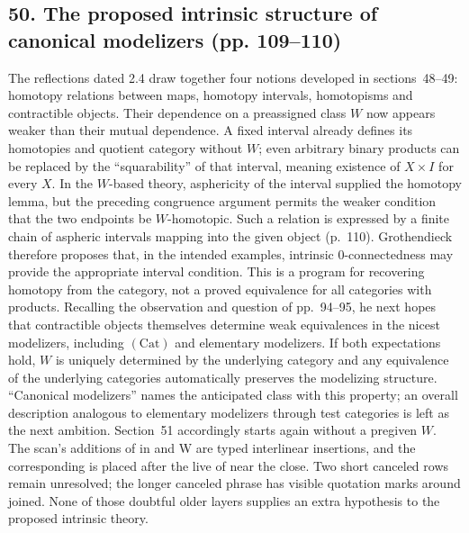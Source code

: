 \subsection*{50. The proposed intrinsic structure of canonical modelizers (pp. 109--110)}
The reflections dated 2.4 draw together four notions developed in sections~48--49: homotopy relations between maps, homotopy intervals, homotopisms and contractible objects. Their dependence on a preassigned class $W$ now appears weaker than their mutual dependence. A fixed interval already defines its homotopies and quotient category without $W$; even arbitrary binary products can be replaced by the ``squarability'' of that interval, meaning existence of $X\times I$ for every $X$. In the $W$-based theory, asphericity of the interval supplied the homotopy lemma, but the preceding congruence argument permits the weaker condition that the two endpoints be $W$-homotopic. Such a relation is expressed by a finite chain of aspheric intervals mapping into the given object (p.~110). Grothendieck therefore proposes that, in the intended examples, intrinsic $0$-connectedness may provide the appropriate interval condition. This is a program for recovering homotopy from the category, not a proved equivalence for all categories with products. Recalling the observation and question of pp.~94--95, he next hopes that contractible objects themselves determine weak equivalences in the nicest modelizers, including $(\mathrm{Cat})$ and elementary modelizers. If both expectations hold, $W$ is uniquely determined by the underlying category and any equivalence of the underlying categories automatically preserves the modelizing structure. ``Canonical modelizers'' names the anticipated class with this property; an overall description analogous to elementary modelizers through test categories is left as the next ambition. Section~51 accordingly starts again without a pregiven $W$. The scan's additions of in and W are typed interlinear insertions, and the corresponding is placed after the live of near the close. Two short canceled rows remain unresolved; the longer canceled phrase has visible quotation marks around joined. None of those doubtful older layers supplies an extra hypothesis to the proposed intrinsic theory.

